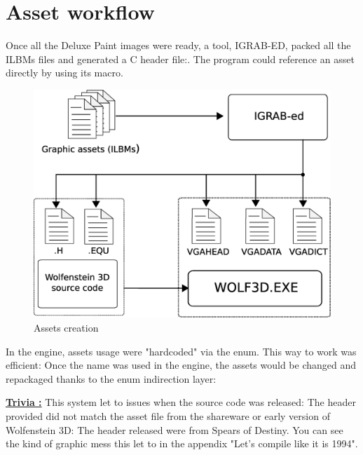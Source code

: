 \documentclass[book.tex]{subfiles}
\begin{document}
\section{Asset workflow}
Once all the Deluxe Paint images were ready, a tool, IGRAB-ED, packed all the ILBMs files and generated a C header file:. The program could reference an asset directly by using its macro.\\
\begin{figure}[H]
\centering
 \includegraphics[width=\textwidth]{imgs/drawing_plain.eps}
 \caption{Assets creation} 
 \end{figure}

\begin{minipage}{\textwidth}
 \par
 \end{minipage}
 
 In the engine, assets usage were "hardcoded" via the enum. This way to work was efficient: Once the name was used in the engine, the assets would be changed and repackaged thanks to the enum indirection layer:\\
 \par
 \begin{minipage}{\textwidth}
 \par
 \end{minipage}

\textbf{\underline{Trivia :}} This system let to issues when the source code was released: The header provided did not match the asset file from the shareware or early version of Wolfenstein 3D: The header released were from Spears of Destiny. You can see the kind of graphic mess this let to in the appendix "Let's compile like it is 1994".\\
\end{document}
